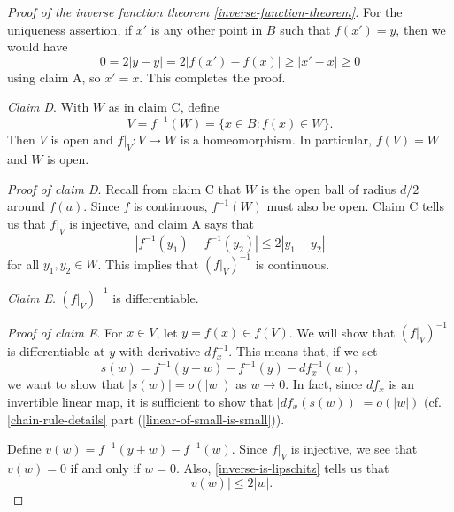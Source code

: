 \begin{proof}[Proof of the inverse function theorem \ref{inverse-function-theorem}]
	For the uniqueness assertion, if $x'$ is any other point in $B$ such that $f(x') = y$, then we would have
	\[ 0 = 2|y - y| = 2|f(x') - f(x)| \geq |x' - x| \geq 0 \]
	using claim A, so $x' = x$. This completes the proof.
	
	\mbox{}
	
	\noindent\textit{Claim D}. With $W$ as in claim C, define \[ V = f^{-1}(W) = \{ x \in B : f(x) \in W \}. \] Then $V$ is open and $f|_V : V \to W$ is a homeomorphism. In particular, $f(V) = W$ and $W$ is open. 
	
	\mbox{}
	
	\noindent\textit{Proof of claim D}. Recall from claim C that $W$ is the open ball of radius $d/2$ around $f(a)$. Since $f$ is continuous, $f^{-1}(W)$ must also be open. Claim C tells us that $f|_V$ is injective, and claim A says that
	\begin{equation} \label{inverse-is-lipschitz} |f^{-1}(y_1) - f^{-1}(y_2)| \leq 2|y_1 - y_2| \end{equation}
	for all $y_1, y_2 \in W$. This implies that $(f|_V)^{-1}$ is continuous. 
	
	\mbox{}
	
	\noindent \textit{Claim E}. $(f|_V)^{-1}$ is differentiable. 
	
	\mbox{}
	
	\noindent \textit{Proof of claim E}. For $x \in V$, let $y = f(x) \in f(V)$. We will show that $(f|_V)^{-1}$ is differentiable at $y$ with derivative $df_x^{-1}$. This means that, if we set
	\[ s(w) = f^{-1}(y + w) - f^{-1}(y) - df_x^{-1}(w), \]
	we want to show that $|s(w)| = o(|w|)$ as $w \to 0$. In fact, since $df_x$ is an invertible linear map, it is sufficient to show that $|df_x(s(w))| = o(|w|)$ (cf. \cref{chain-rule-details} part  (\ref{linear-of-small-is-small})). 
	
	Define $v(w) = f^{-1}(y + w) - f^{-1}(w)$. Since $f|_V$ is injective, we see that $v(w) = 0$ if and only if $w = 0$.  Also, \cref{inverse-is-lipschitz} tells us that 
	\begin{equation} \label{inverse-is-lipschitz-reframed} |v(w)| \leq 2|w|.
	\end{equation}
	

\end{proof}
